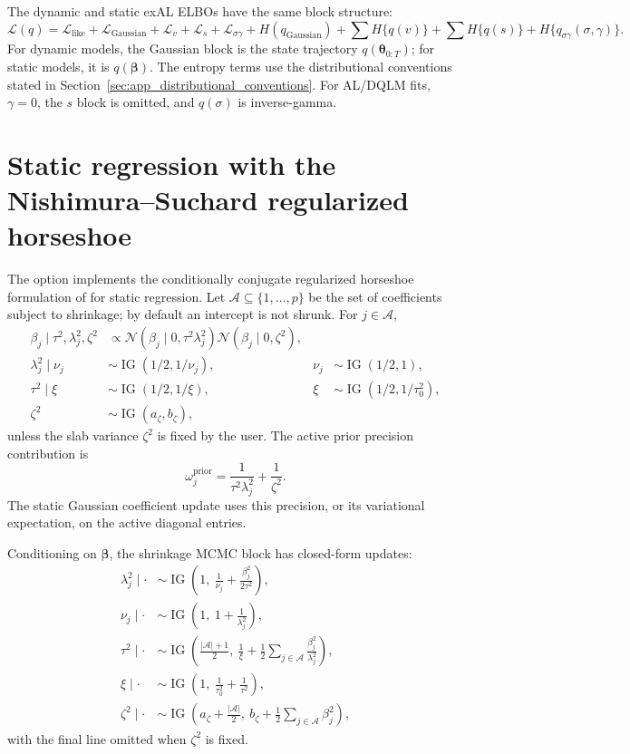 \documentclass{jss}
\newcommand{\vect}[1]{\boldsymbol{#1}}
\newcommand{\N}{\mathcal{N}}
\newcommand{\IG}{\operatorname{IG}}
\newcommand{\elbo}{\mathcal{L}}
\begin{document}
The dynamic and static exAL ELBOs have the same block structure:
\begin{equation}
\elbo(q)=
\elbo_{\mathrm{like}}+\elbo_{\mathrm{Gaussian}}
+\elbo_v+\elbo_s+\elbo_{\sigma\gamma}
+H(q_{\mathrm{Gaussian}})
+\sum H\{q(v)\}+\sum H\{q(s)\}+H\{q_{\sigma\gamma}(\sigma,\gamma)\}.
\label{eq:dyn_exdqlm_elbo}
\end{equation}
For dynamic models, the Gaussian block is the state trajectory
$q(\vect{\theta}_{0:T})$; for static models, it is $q(\vect{\beta})$.
The entropy terms use the distributional conventions stated in
Section~\ref{sec:app_distributional_conventions}. For AL/DQLM fits,
$\gamma=0$, the $s$ block is omitted, and $q(\sigma)$ is inverse-gamma.

\section{Static regression with the Nishimura--Suchard regularized horseshoe}
\label{sec:static_rhs}

The  option implements the conditionally conjugate
regularized horseshoe formulation of \citet{nishimura2023shrunken} for
static regression. Let $\mathcal{A}\subseteq\{1,\ldots,p\}$ be the set of
coefficients subject to shrinkage; by default an intercept is not shrunk. For
$j\in\mathcal{A}$,
\begin{align}
\beta_j\mid\tau^2,\lambda_j^2,\zeta^2
&\propto
\N(\beta_j\mid0,\tau^2\lambda_j^2)
\N(\beta_j\mid0,\zeta^2),\\
\lambda_j^2\mid\nu_j &\sim \IG(1/2,1/\nu_j),&
\nu_j&\sim\IG(1/2,1),\\
\tau^2\mid\xi &\sim\IG(1/2,1/\xi),&
\xi&\sim\IG(1/2,1/\tau_0^2),\\
\zeta^2&\sim\IG(a_\zeta,b_\zeta),
\label{eq:rhs_ns_hierarchy}
\end{align}
unless the slab variance $\zeta^2$ is fixed by the user. The active prior
precision contribution is
\begin{equation}
\omega^{\mathrm{prior}}_j
=\frac{1}{\tau^2\lambda_j^2}+\frac{1}{\zeta^2}.
\label{eq:rhs_ns_precision}
\end{equation}
The static Gaussian coefficient update uses this precision, or its
variational expectation, on the active diagonal entries.

Conditioning on $\vect{\beta}$, the shrinkage MCMC block has closed-form
updates:
\begin{align}
\lambda_j^2\mid\cdot
&\sim
\IG\left(1,\ \frac{1}{\nu_j}+\frac{\beta_j^2}{2\tau^2}\right),\\
\nu_j\mid\cdot
&\sim
\IG\left(1,\ 1+\frac{1}{\lambda_j^2}\right),\\
\tau^2\mid\cdot
&\sim
\IG\left(\frac{|\mathcal{A}|+1}{2},\
\frac{1}{\xi}
+\frac{1}{2}\sum_{j\in\mathcal{A}}\frac{\beta_j^2}{\lambda_j^2}
\right),\\
\xi\mid\cdot
&\sim
\IG\left(1,\ \frac{1}{\tau_0^2}+\frac{1}{\tau^2}\right),\\
\zeta^2\mid\cdot
&\sim
\IG\left(a_\zeta+\frac{|\mathcal{A}|}{2},\
b_\zeta+\frac{1}{2}\sum_{j\in\mathcal{A}}\beta_j^2
\right),
\label{eq:rhs_ns_mcmc}
\end{align}
with the final line omitted when $\zeta^2$ is fixed.
\end{document}
